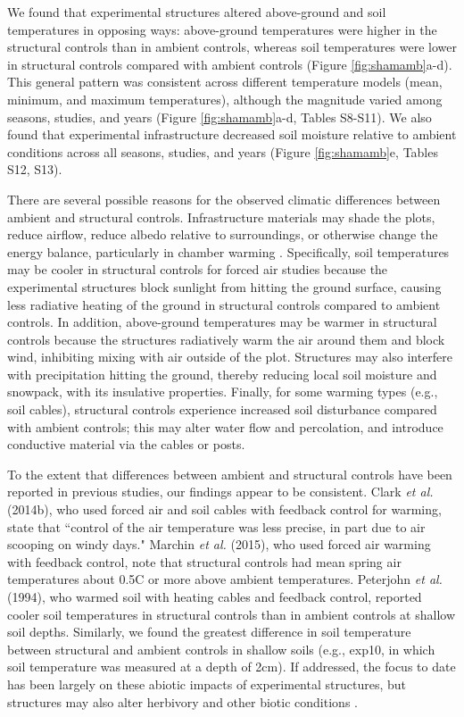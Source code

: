 \documentclass{article}
\begin{document}
\par We found that experimental structures altered above-ground and soil temperatures in opposing ways: above-ground temperatures were higher in the structural controls than in ambient controls, whereas soil temperatures were lower in structural controls compared with ambient controls (Figure \ref{fig:shamamb}a-d). This general pattern was consistent across different temperature models (mean, minimum, and maximum temperatures), although the magnitude varied among seasons, studies, and years (Figure \ref{fig:shamamb}a-d, Tables S8-S11). We also found that experimental infrastructure decreased soil moisture relative to ambient conditions across all seasons, studies, and years (Figure \ref{fig:shamamb}e, Tables S12, S13). 
\par There are several possible reasons for the observed climatic differences between ambient and structural controls. Infrastructure materials may shade the plots, reduce airflow, reduce albedo relative to surroundings, or otherwise change the energy balance, particularly in chamber warming \citep[i.e., 4 of the 5 studies included in the above analysis, see also][]{aronson2009}. Specifically, soil temperatures may be cooler in structural controls for forced air studies because the experimental structures block sunlight from hitting the ground surface, causing less radiative heating of the ground in structural controls compared to ambient controls. In addition, above-ground temperatures may be warmer in structural controls because the structures radiatively warm the air around them and block wind, inhibiting mixing with air outside of the plot. Structures may also interfere with precipitation hitting the ground, thereby reducing local soil moisture and snowpack, with its insulative properties. Finally, for some warming types (e.g., soil cables), structural controls experience increased soil disturbance compared with ambient controls; this may alter water flow and percolation, and introduce conductive material via the cables or posts. 

\par To the extent that differences between ambient and structural controls have been reported in previous studies, our findings appear to be consistent. Clark \textit{et al.} (2014b), who used forced air and soil cables with feedback control for warming, state that ``control of the air temperature was less precise, in part due to air scooping on windy days." Marchin \textit{et al.} (2015), who used forced air warming with feedback control, note that structural controls had mean spring air temperatures about 0.5\degree C or more above ambient temperatures. Peterjohn \textit{et al.} (1994), who warmed soil with heating cables and feedback control, reported cooler soil temperatures in structural controls than in ambient controls at shallow soil depths. Similarly, we found the greatest difference in soil temperature between structural and ambient controls in shallow soils (e.g., exp10, in which soil temperature was measured at a depth of 2cm). If addressed, the focus to date has been largely on these abiotic impacts of experimental structures, but structures may also alter herbivory and other biotic conditions \citep{kennedy1995,moise2010,wolkovich2012,hoeppner2012}. 
\end{document}
